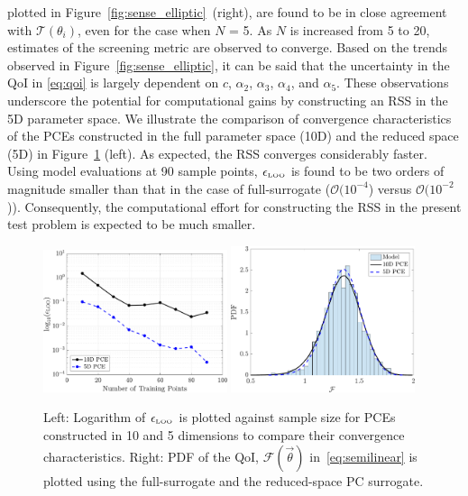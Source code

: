 plotted in Figure~\ref{fig:sense_elliptic}~(right), are found to
be in close agreement with $\mathcal{T}(\theta_i)$, even for the case when $N$ = 5. As $N$
is increased from 5 to 20, estimates of the screening metric are observed to converge.
Based on the trends observed in Figure~\ref{fig:sense_elliptic}, it can be said that
the uncertainty in the QoI in \eqref{eq:qoi} is largely dependent on $c$, 
$\alpha_2$, $\alpha_3$, $\alpha_4$, and $\alpha_5$. These observations underscore the
potential for computational gains by constructing an RSS in the 5D parameter space. We 
illustrate the comparison of convergence characteristics of the PCEs constructed in the
full parameter space (10D) and the reduced space (5D) in Figure~\ref{fig:conv_elliptic} (left). 
As expected, the RSS converges considerably faster. Using model evaluations at 90
sample points, $\epsilon_{\mbox{\tiny{LOO}}}$ is found to be two orders of magnitude
smaller than that in the case of full-surrogate ($\mathcal{O}(10^{-4}$) versus
$\mathcal{O}(10^{-2}$)). 
Consequently, the computational effort for constructing the RSS in the present test problem
is expected to be much smaller. 
%
\begin{figure}[htbp]
 \begin{center}
  \includegraphics[width=0.48\textwidth]{./Figures/err_samples_elliptic}
  \includegraphics[width=0.48\textwidth]{./Figures/pdf_comp_elliptic}
\caption{Left: Logarithm of $\epsilon_{\mbox{\tiny{LOO}}}$ is plotted against sample size for 
PCEs constructed in 10 and 5 dimensions to compare their convergence characteristics. 
Right: PDF of the QoI, $\mathcal{F}(\vec\theta)$ in~\eqref{eq:semilinear} is
plotted using the full-surrogate and the reduced-space PC surrogate.}
\label{fig:conv_elliptic}
\end{center}
\end{figure}

